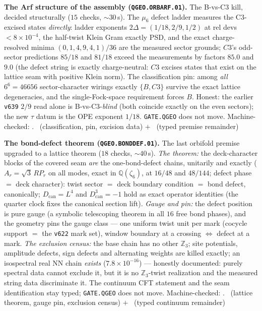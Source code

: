 \documentclass[11pt,a4paper]{article}
\theoremstyle{definition}
\begin{document}
\par\smallskip\noindent\textbf{The Arf structure of the assembly
(\texttt{QGEO.ORBARF.01}).}
The B-vs-C3 kill, decided structurally ($15$ checks, ${\sim}30$\,s).
The $\mu_6$ defect ladder measures the C3-excised states
\emph{directly}: ladder exponents $2\Delta=(1/18, 2/9, 1/2)$ at rel
devs $<8\times10^{-4}$, the half-twist Klein Gram exactly PSD, and
the exact charge-resolved minima $(0,1,4,9,4,1)/36$ are the measured
sector grounds; $C3$'s odd-sector predictions $85/18$ and $81/18$
exceed the measurements by factors $85.0$ and $9.0$ (the defect
string is exactly charge-neutral: $C3$ excises states that exist on
the lattice seam with positive Klein norm).  The classification pin:
among \emph{all} $6^6=46656$ sector-character wirings exactly
$\{B, C3\}$ survive the exact lattice degeneracies, and the
single-Fock-space requirement forces $B$.  Honest: the earlier
\texttt{v639} $2/9$ read alone is B-vs-C3-\emph{blind} (both coincide
exactly on the even sectors); the new $\tau$ datum is the OPE
exponent $1/18$.  \texttt{GATE.QGEO} does not move.
Machine-checked: .
\mE\ (classification, pin, excision data) $+$ \mC\ (typed premise
remainder)
\par\smallskip

\par\smallskip\noindent\textbf{The bond-defect theorem
(\texttt{QGEO.BONDDEF.01}).}
The last orbifold premise upgraded to a lattice theorem ($18$ checks,
${\sim}40$\,s).  \emph{The theorem:} the deck-character blocks of the
covered seam \emph{are} the one-bond-defect chains, unitarily and
exactly ($A_r=\sqrt3\,R P_r$ on all modes, exact in
$\mathbb{Q}(\zeta_6)$, at $16/48$ and $48/144$; defect phase $=$ deck
character): twist sector $=$ deck boundary condition $=$ bond defect,
canonically; $D_{\mathrm{can}}=L^4$ and $D_{\mathrm{can}}^3=-1$ hold
as exact operator identities (the quarter clock fixes the canonical
section lift).  \emph{Gauge and pin:} the defect position is pure
gauge (a symbolic telescoping theorem in all $16$ free bond phases),
and the geometry pins the gauge class --- one uniform twist unit per
mark (cocycle support $=$ the \texttt{v622} mark set), window
boundary at a crossing $\Leftrightarrow$ defect at a mark.  \emph{The
exclusion census:} the base chain has no other $\mathbb{Z}_3$; site
potentials, amplitude defects, sign defects and alternating weights
are killed exactly; an isospectral real NN chain \emph{exists}
($7.8\times10^{-16}$) --- honestly documented: purely spectral data
cannot exclude it, but it is no $\mathbb{Z}_3$-twist realization and
the measured string data discriminate it.  The continuum CFT
statement and the seam identification stay typed; \texttt{GATE.QGEO}
does not move.
Machine-checked: .
\mE\ (lattice theorem, gauge pin, exclusion census) $+$ \mC\ (typed
continuum remainder)
\par\smallskip
\end{document}
